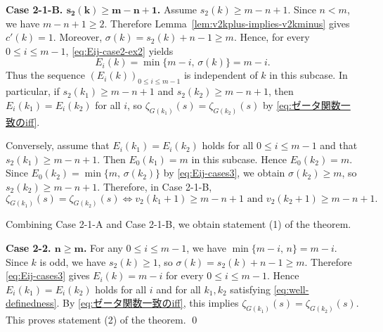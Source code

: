 \documentclass[onecolumn]{article}
\makeatletter
\numberwithin{equation}{section}
\theoremstyle{mytheoremstyle}
\renewenvironment{proof}[1][\proofname]{%
  \par\normalfont 
  \topsep6pt\relax 
  \trivlist\item[\hskip\labelsep\itshape #1\@addpunct{.}]\ignorespaces
}{%
  \qed\endtrivlist\@endpefalse
}
\makeatother
\begin{document}
\begin{proof}
\medskip\noindent
\textbf{Case 2-1-B. $\bm{s_{2}(k)\ge m-n+1}$.}
Assume $s_{2}(k)\ge m-n+1$.
Since $n<m$, we have $m-n+1\ge 2$.
Therefore Lemma~\ref{lem:v2kplus-implies-v2kminus} gives $c'(k)=1$.
Moreover, $\sigma(k)=s_{2}(k)+n-1\ge m$.
Hence, for every $0\le i\le m-1$, \eqref{eq:Eij-case2-ex2} yields
\[
  E_{i}(k)=\min\{m-i,\,\sigma(k)\}=m-i.
\]
Thus the sequence $(E_{i}(k))_{0\le i\le m-1}$ is independent of $k$ in this subcase.
In particular, if $s_{2}(k_{1})\ge m-n+1$ and $s_{2}(k_{2})\ge m-n+1$, then
$E_{i}(k_{1})=E_{i}(k_{2})$ for all $i$, so
$\zeta_{G(k_{1})}(s)=\zeta_{G(k_{2})}(s)$ by \eqref{eq:ゼータ関数一致のiff}.

Conversely, assume that $E_{i}(k_{1})=E_{i}(k_{2})$ holds for all $0\le i\le m-1$
and that $s_{2}(k_{1})\ge m-n+1$.
Then $E_{0}(k_{1})=m$ in this subcase.
Hence $E_{0}(k_{2})=m$.
Since $E_{0}(k_{2})=\min\{m,\,\sigma(k_{2})\}$ by \eqref{eq:Eij-cases3},
we obtain $\sigma(k_{2})\ge m$, so $s_{2}(k_{2})\ge m-n+1$.
Therefore, in Case 2-1-B,
\[
  \zeta_{G(k_{1})}(s)=\zeta_{G(k_{2})}(s)
  \iff
  v_{2}(k_{1}+1)\ge m-n+1 \text{ and } v_{2}(k_{2}+1)\ge m-n+1.
\]

Combining Case 2-1-A and Case 2-1-B, we obtain statement \textup{(1)} of the theorem.

\medskip\noindent
\textbf{Case 2-2. $\bm{n\ge m}$.}
For any $0\le i\le m-1$, we have $\min\{m-i,\,n\}=m-i$.
Since $k$ is odd, we have $s_{2}(k)\ge 1$, so $\sigma(k)=s_{2}(k)+n-1\ge m$.
Therefore \eqref{eq:Eij-cases3} gives $E_{i}(k)=m-i$ for every $0\le i\le m-1$.
Hence $E_{i}(k_{1})=E_{i}(k_{2})$ holds for all $i$ and for all $k_{1},k_{2}$ satisfying \eqref{eq:well-definedness}.
By \eqref{eq:ゼータ関数一致のiff}, this implies
$\zeta_{G(k_{1})}(s)=\zeta_{G(k_{2})}(s)$.
This proves statement \textup{(2)} of the theorem.
\end{proof}
\end{document}
